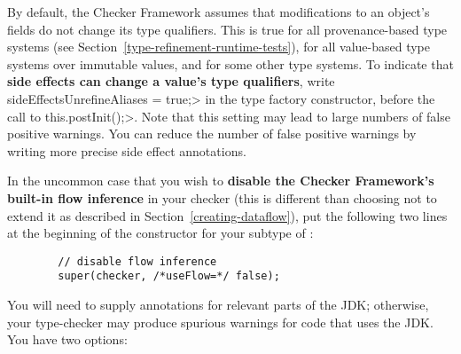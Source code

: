 \label{creating-dataflow-disable} %

By default, the Checker Framework assumes that modifications to an object's
fields do not change its type qualifiers.  This is true for all
provenance-based type systems (see
Section~\ref{type-refinement-runtime-tests}), for all value-based type
systems over immutable values, and for some other type systems.  To
indicate that \textbf{side effects can change a value's type qualifiers},
write \<sideEffectsUnrefineAliases = true;> in the type factory
constructor, before the call to \<this.postInit();>.  Note that this
setting may lead to large numbers of false positive warnings.  You can
reduce the number of false positive warnings by writing more precise side
effect annotations.

In the uncommon case that you wish to \textbf{disable the Checker Framework's
built-in flow inference} in your checker (this is different than choosing
not to extend it as described in Section~\ref{creating-dataflow}), put the
following two lines at the beginning of the constructor for your subtype of
:

\begin{Verbatim}
        // disable flow inference
        super(checker, /*useFlow=*/ false);
\end{Verbatim}



You will need to supply annotations for relevant parts of the JDK;
otherwise, your type-checker may produce spurious warnings for code that
uses the JDK\@.  You have two options:

